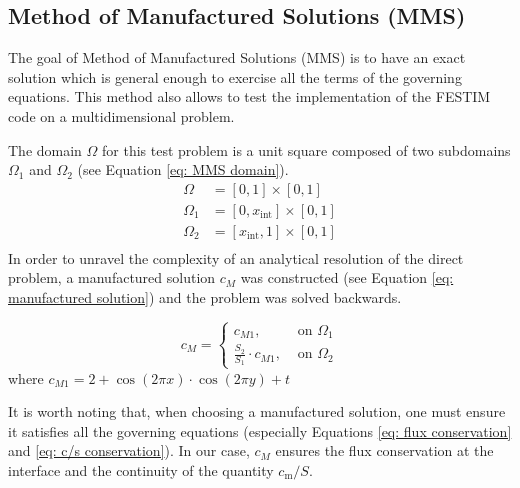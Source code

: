 \subsection{Method of Manufactured Solutions (MMS)}

The goal of Method of Manufactured Solutions (MMS) is to have an exact solution which is general enough to exercise all the terms of the governing equations.
This method also allows to test the implementation of the FESTIM code on a multidimensional problem.

The domain $\Omega$ for this test problem is a unit square composed of two subdomains $\Omega_1$ and $\Omega_2$ (see Equation \ref{eq: MMS domain}).
\begin{subequations} \label{eq: MMS domain}
\begin{align}
    \Omega &= [0, 1] \times [0, 1] \\
    \Omega_1 &= [0, x_\mathrm{int}] \times [0, 1] \\
    \Omega_2 &= [x_\mathrm{int}, 1] \times [0, 1] \\
\end{align}
\end{subequations}
In order to unravel the complexity of an analytical resolution of the direct problem, a manufactured solution $c_M$ was constructed (see Equation \ref{eq: manufactured solution}) and the problem was solved backwards.

\begin{equation}
        c_M= 
\begin{cases}
    c_{M1},& \text{ on } \Omega_1\\
    \frac{S_2}{S_1} \cdot c_{M1},& \text{ on } \Omega_2
\end{cases}
\label{eq: manufactured solution}
\end{equation}
where $c_{M1} = 2 + \cos(2\pi x) \cdot \cos(2\pi y) + t$

It is worth noting that, when choosing a manufactured solution, one must ensure it satisfies all the governing equations (especially Equations \ref{eq: flux conservation} and \ref{eq: c/s conservation}).
In our case, $c_M$ ensures the flux conservation at the interface and the continuity of the quantity $c_\mathrm{m}/S$.

